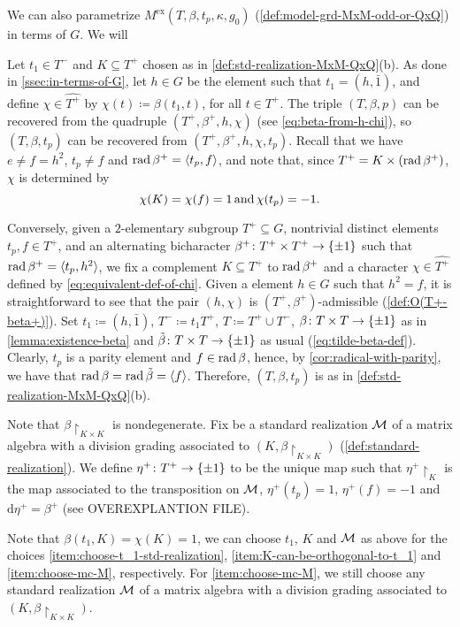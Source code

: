 We can also parametrize $M^{\mathrm{ex}}(T, \beta, t_p, \kappa, g_0)$ (\cref{def:model-grd-MxM-odd-or-QxQ}) in terms of $G$. 
We will 

Let $t_1 \in T^-$ and $K \subseteq T^+$ chosen as in \cref{def:std-realization-MxM-QxQ}(b). 
As done in \cref{ssec:in-terms-of-G}, let $h \in G$ be the element such that $t_1 = (h, \bar 1)$, and define $\chi \in \widehat{T^+}$ by $\chi(t) \coloneqq \beta(t_1, t)$, for all $t\in T^+$. 
The triple $(T, \beta, p)$ can be recovered from the quadruple $(T^+, \beta^+, h, \chi)$ (see \cref{eq:beta-from-h-chi}), so $(T, \beta, t_p)$ can be recovered from $(T^+, \beta^+, h, \chi, t_p)$. 
Recall that we have $e \neq f = h^2$, $t_p \neq f$ and $\operatorname{rad} \beta^+ = \langle t_p, f \rangle$, and note that, since $T^+ = K \times (\operatorname{rad} \beta^+)$, $\chi$ is determined by 
\[\label{eq:equivalent-def-of-chi}
    \chi(K) = \chi(f) = 1 \,\text{and}\, \chi(t_p) = -1.
\]

Conversely, given a $2$-elementary subgroup $T^+ \subseteq G$, nontrivial distinct elements $t_p, f \in T^+$, and an alternating bicharacter $\beta^+\colon T^+ \times T^+ \to \{ \pm 1 \}$ such that $\operatorname{rad} \beta^+ = \langle t_p, h^2 \rangle$, we fix a complement $K \subseteq T^+$ to $\operatorname{rad} \beta^+$ and a character $\chi \in \widehat{T^+}$ defined by \cref{eq:equivalent-def-of-chi}. 
Given a element $h \in G$ such that $h^2 = f$, it is straightforward to see that the pair $(h, \chi)$ is $(T^+, \beta^+)$-admissible (\cref{def:O(T+-beta+)}). 
Set $t_1 \coloneqq (h, \bar 1)$, $T^- \coloneqq t_1 T^+$, $T \coloneqq T^+ \cup T^-$, $\beta\colon T\times T\to \{ \pm 1 \}$ as in \cref{lemma:existence-beta} and $\tilde\beta\colon T\times T\to \{ \pm 1 \}$ as usual (\cref{eq:tilde-beta-def}). 
Clearly, $t_p$ is a parity element and $f\in \operatorname{rad} \beta$, hence, by \cref{cor:radical-with-parity}, we have that $\operatorname{rad} \beta = \operatorname{rad} \tilde\beta = \langle f \rangle$. 
Therefore, $(T, \beta, t_p)$ is as in \cref{def:std-realization-MxM-QxQ}(b). 

Note that $\beta\restriction_{K\times K}$ is nondegenerate. 
Fix be a standard realization $\mathcal M$ of a matrix algebra with a division grading associated to $(K, \beta\restriction_{K\times K})$ (\cref{def:standard-realization}). 
We define $\eta^+\colon T^+ \to \{ \pm 1 \}$ to be the unique map such that $\eta^+\restriction_{K}$ is the map associated to the transposition on $\mathcal M$, $\eta^+(t_p) = 1$, $\eta^+(f) = -1$ and $\mathrm{d}\eta^+ = \beta^+$ (see OVEREXPLANTION FILE). 

Note that $\beta(t_1, K) = \chi(K) = 1$, we can choose $t_1$, $K$ and $\mathcal M$ as above for the choices \eqref{item:choose-t_1-std-realization}, \eqref{item:K-can-be-orthogonal-to-t_1} and \eqref{item:choose-mc-M}, respectively.   
For \cref{item:choose-mc-M}, we still choose any standard realization $\mathcal M$ of a matrix algebra with a division grading associated to $(K, \beta\restriction_{K\times K})$. 


